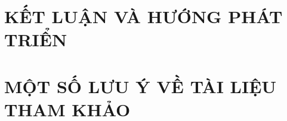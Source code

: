 \documentclass[a4paper,13pt,3p,twoside]{report}
\renewcommand{\bibname}{Danh_sach_tai_lieu_tham_khao}
\theoremstyle{definition}
\begin{document}
\chapter{KẾT LUẬN VÀ HƯỚNG PHÁT TRIỂN} %
\label{chapter:conclusion}


\newpage
\chapter*{MỘT SỐ LƯU Ý VỀ TÀI LIỆU THAM KHẢO} %
\label{chapter:reference}



\newpage
\renewcommand\bibname{TÀI LIỆU THAM KHẢO}
\printbibliography
{}




% 
% 
\end{document}

